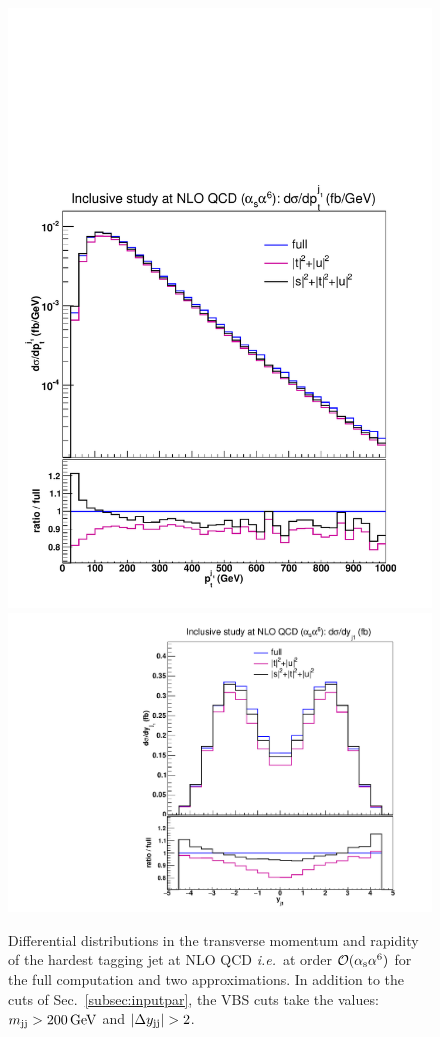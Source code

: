 \begin{figure}[hbt]
\centering
{\includegraphics[scale=0.35]{figures/scanfigures/ptj1_nlo.pdf}}
{\includegraphics[scale=0.35]{figures/scanfigures/yj1_nlo.pdf}}
\caption{Differential distributions in the transverse momentum and rapidity of the hardest tagging jet at NLO QCD \emph{i.e.}\ at order $\mathcal{O}(\alpha_\text{s}\alpha^6)$ for the full computation and two approximations.
In addition to the cuts of Sec.~\ref{subsec:inputpar}, the VBS cuts take the values: $m_{\text{j}\text{j}}>200 \,\text{GeV}$ and $|\Delta y_{\Pj\Pj}|>2$.} 
\label{fig:mjjdyjj_1d_2}
\end{figure}

